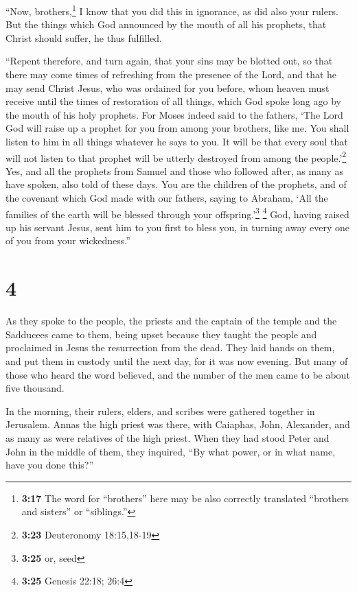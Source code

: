  ``Now, brothers,\footnote{\textbf{3:17} The word for
  ``brothers'' here may be also correctly translated ``brothers and
  sisters'' or ``siblings.''} I know that you did this in ignorance, as
did also your rulers.  But the things which God announced
by the mouth of all his prophets, that Christ should suffer, he thus
fulfilled.

 ``Repent therefore, and turn again, that your sins may
be blotted out, so that there may come times of refreshing from the
presence of the Lord,  and that he may send Christ Jesus,
who was ordained for you before,  whom heaven must
receive until the times of restoration of all things, which God spoke
long ago by the mouth of his holy prophets.  For Moses
indeed said to the fathers, `The Lord God will raise up a prophet for
you from among your brothers, like me. You shall listen to him in all
things whatever he says to you.  It will be that every
soul that will not listen to that prophet will be utterly destroyed from
among the people.'\footnote{\textbf{3:23} Deuteronomy 18:15,18-19}
 Yes, and all the prophets from Samuel and those who
followed after, as many as have spoken, also told of these days.
 You are the children of the prophets, and of the
covenant which God made with our fathers, saying to Abraham, `All the
families of the earth will be blessed through your
offspring.'\footnote{\textbf{3:25} or, seed} \footnote{\textbf{3:25}
  Genesis 22:18; 26:4}  God, having raised up his servant
Jesus, sent him to you first to bless you, in turning away every one of
you from your wickedness.''

\hypertarget{section-3}{%
\section{4}\label{section-3}}

 As they spoke to the people, the priests and the captain
of the temple and the Sadducees came to them,  being upset
because they taught the people and proclaimed in Jesus the resurrection
from the dead.  They laid hands on them, and put them in
custody until the next day, for it was now evening.  But
many of those who heard the word believed, and the number of the men
came to be about five thousand.

 In the morning, their rulers, elders, and scribes were
gathered together in Jerusalem.  Annas the high priest was
there, with Caiaphas, John, Alexander, and as many as were relatives of
the high priest.  When they had stood Peter and John in
the middle of them, they inquired, ``By what power, or in what name,
have you done this?''


